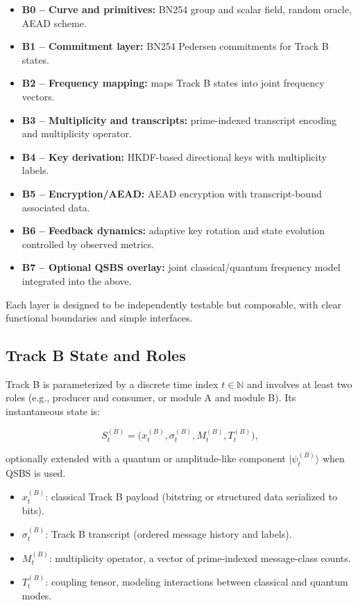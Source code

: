 \documentclass[11pt]{article}
\newcommand{\N}{\mathbb{N}}
\begin{document}
\begin{itemize}[leftmargin=1.5em]
  \item \textbf{B0 -- Curve and primitives:} BN254 group and scalar field, random oracle, AEAD scheme.
  \item \textbf{B1 -- Commitment layer:} BN254 Pedersen commitments for Track B states.
  \item \textbf{B2 -- Frequency mapping:} maps Track B states into joint frequency vectors.
  \item \textbf{B3 -- Multiplicity and transcripts:} prime-indexed transcript encoding and multiplicity operator.
  \item \textbf{B4 -- Key derivation:} HKDF-based directional keys with multiplicity labels.
  \item \textbf{B5 -- Encryption/AEAD:} AEAD encryption with transcript-bound associated data.
  \item \textbf{B6 -- Feedback dynamics:} adaptive key rotation and state evolution controlled by observed metrics.
  \item \textbf{B7 -- Optional QSBS overlay:} joint classical/quantum frequency model integrated into the above.
\end{itemize}

Each layer is designed to be independently testable but composable, with clear functional boundaries and simple interfaces.

\subsection{Track B State and Roles}

Track B is parameterized by a discrete time index \(t \in \N\) and involves at least two roles (e.g., producer and consumer, or module A and module B).
Its instantaneous state is:

\[
  S_t^{(B)} = \bigl(x_t^{(B)}, \sigma_t^{(B)}, M_t^{(B)}, T_t^{(B)}\bigr),
\]

optionally extended with a quantum or amplitude-like component \(|\psi_t^{(B)}\rangle\) when QSBS is used.

\begin{itemize}[leftmargin=1.5em]
  \item \(x_t^{(B)}\): classical Track B payload (bitstring or structured data serialized to bits).
  \item \(\sigma_t^{(B)}\): Track B transcript (ordered message history and labels).
  \item \(M_t^{(B)}\): multiplicity operator, a vector of prime-indexed message-class counts.
  \item \(T_t^{(B)}\): coupling tensor, modeling interactions between classical and quantum modes.
\end{itemize}
\end{document}
